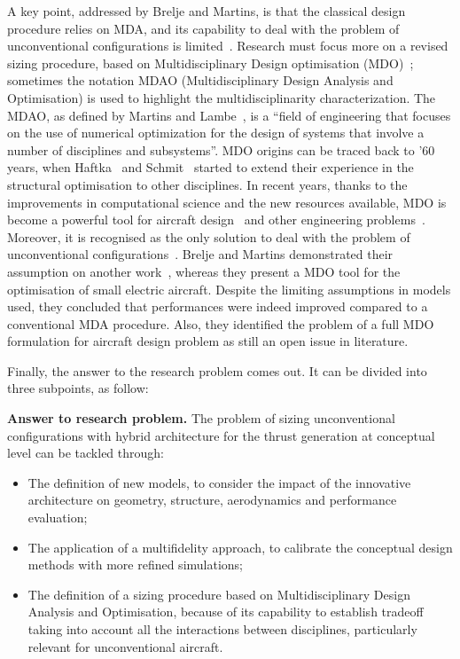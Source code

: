 A key point, addressed by Brelje and Martins, is that the classical design procedure relies on MDA, and its capability to deal with the problem of unconventional configurations is limited~\cite{bib:brelje_biblio}.
Research must focus more on a revised sizing procedure, based on Multidisciplinary Design optimisation (MDO)~\cite{bib:martins_mdo}; sometimes the notation MDAO (Multidisciplinary Design Analysis and Optimisation) is used to highlight the multidisciplinarity characterization. 
The MDAO, as defined by Martins and Lambe~\cite{bib:martins_mdo}, is a ``field of engineering that focuses on the use of numerical optimization for the design of systems that involve a number of disciplines and subsystems''.
MDO origins can be traced back to '60 years, when Haftka~\cite{bib:haftka_1973, bib:haftka_1975, bib:haftka_1977, bib:haftka_1979} and Schmit~\cite{bib:schmit_1960, bib:schmit_1965, bib:schmit_1981, bib:schmit_1984} started to extend their experience in the structural optimisation to other disciplines. 
In recent years, thanks to the improvements in computational science and the new resources available, MDO is become a powerful tool for aircraft design~\cite{bib:kroo, bib:manning, bib:antoine, bib:henderson, bib:alonso} and other engineering problems~\cite{bib:martins_mdo}. 
Moreover, it is recognised as the only solution to deal with the problem of unconventional configurations~\cite{bib:lyu, bib:raymer, bib:brelje_biblio}. 
Brelje and Martins demonstrated their assumption on another work~\cite{bib:brelje_model}, whereas they present a MDO tool for the optimisation of small electric aircraft. 
Despite the limiting assumptions in models used, they concluded that performances were indeed improved compared to a conventional MDA procedure. 
Also, they identified the problem of a full MDO formulation for aircraft design problem as still an open issue in literature. 

Finally, the answer to the research problem comes out. 
It can be divided into three subpoints, as follow: 
\begin{mdframed}[hidealllines=true,backgroundcolor=green!20]
	\textbf{Answer to research problem.} 
	The problem of sizing unconventional configurations with hybrid architecture for the thrust generation at conceptual level can be tackled through:
	\begin{itemize}
		\item The definition of new models, to consider the impact of the innovative architecture on geometry, structure, aerodynamics and performance evaluation;
		
		\item The application of a multifidelity approach, to calibrate the conceptual design methods with more refined simulations;
		
		\item The definition of a sizing procedure based on Multidisciplinary Design Analysis and Optimisation, because of its capability to establish tradeoff taking into account all the interactions between disciplines, particularly relevant for unconventional aircraft. 
	\end{itemize} 
\end{mdframed}

